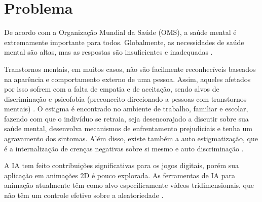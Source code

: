 \chapter{Problema}
\label{c.problema}

De acordo com a Organização Mundial da Saúde (OMS), a saúde mental é extremamente importante para todos. Globalmente, as necessidades de saúde mental são altas, mas as respostas são insuficientes e inadequadas \cite{world}.

Transtornos mentais, em muitos casos, não são facilmente reconhecíveis baseados na aparência e comportamento externo de uma pessoa. Assim, aqueles afetados por isso sofrem com a falta de empatia e de aceitação, sendo alvos de discriminação e psicofobia (preconceito direcionado a pessoas com transtornos mentais) \cite{kasdorf_2023}. O estigma é encontrado no ambiente de trabalho, familiar e escolar, fazendo com que o indivíduo se retraia, seja desencorajado a discutir sobre sua saúde mental, desenvolva mecanismos de enfrentamento prejudiciais e tenha um agravamento dos sintomas. Além disso, existe também a  auto estigmatização, que é a internalização de crenças negativas sobre si mesmo e auto discriminação \cite{Roma_2024}.

A IA tem feito contribuições significativas para os jogos digitais, porém sua aplicação em animações 2D é pouco explorada. As ferramentas de IA para animação atualmente têm como alvo especificamente vídeos tridimensionais, que não têm um controle efetivo sobre a aleatoriedade \cite{articleIAanima}. 







